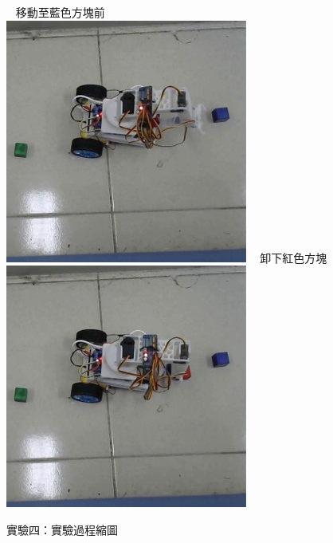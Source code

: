 \documentclass[class=NCU_thesis, crop=false]{standalone}
\begin{document}
\begin{figure}[h]
    ~    
    \subcaptionbox
        {移動至藍色方塊前
        \label{fig:fig-dataset-contrast-after-adjustment}}
        {\includegraphics[width=0.4\linewidth]{figures/DRIVE (5).jpg}}
    ~
    \subcaptionbox
        {卸下紅色方塊
        \label{fig:fig-dataset-contrast-after-adjustment}}
        {\includegraphics[width=0.4\linewidth]{figures/DRIVE (6).jpg}}   
\caption{實驗四：實驗過程縮圖}
\end{figure}
\end{document}
